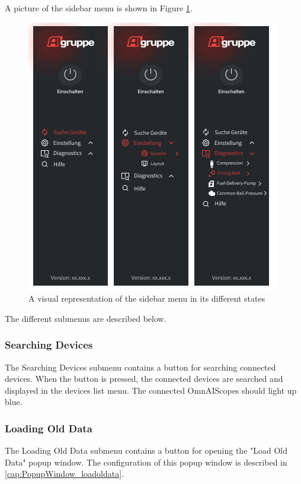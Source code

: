\documentclass[]{scrreprt}
\begin{document}
A picture of the sidebar menu is shown in Figure \ref{fig:sidebarMenu}.

\begin{figure}
    \includegraphics[width=.9\textwidth]{assets/pictures/SideBarMenu.png}
    \caption[]{A visual representation of the sidebar menu in its different states}
    \label{fig:sidebarMenu}
\end{figure}

The different submenus are described below.

\subsubsection{Searching Devices}

The Searching Devices submenu contains a button for searching connected devices. When the button is pressed, the connected devices are searched and displayed in the devices list menu. The connected OmnAIScopes should light up blue.

\subsubsection{Loading Old Data}

The Loading Old Data submenu contains a button for opening the "Load Old Data" popup window. The configuration of this popup window is described in \ref{cap:PopupWindow_loadoldata}.
\end{document}
